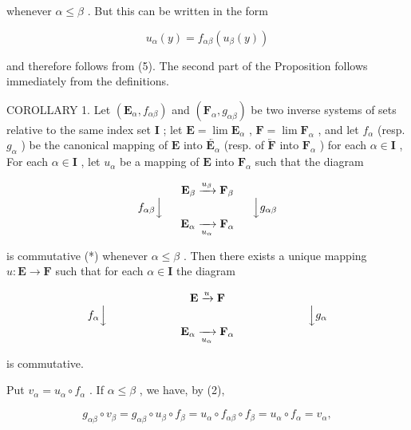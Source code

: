 whenever \(\alpha \leqslant \beta\) . But this can be written in the form

\[
u _ {\alpha} (y) = f _ {\alpha \beta} (u _ {\beta} (y))
\]

and therefore follows from (5). The second part of the Proposition follows immediately from the definitions.

COROLLARY 1. Let \((\mathbf{E}_{\alpha}, f_{\alpha \beta})\) and \((\mathbf{F}_{\alpha}, g_{\alpha \beta})\) be two inverse systems of sets relative to the same index set \(\mathbf{I}\) ; let \(\mathbf{E} = \lim \mathbf{E}_{\alpha}\) , \(\mathbf{F} = \lim \mathbf{F}_{\alpha}\) , and let \(f_{\alpha}\) (resp. \(g_{\alpha}\) ) be the canonical mapping of \(\mathbf{E}\) into \(\overleftarrow{\mathbf{E}_{\alpha}}\) (resp. of \(\overleftarrow{\mathbf{F}}\) into \(\mathbf{F}_{\alpha}\) ) for each \(\alpha \in \mathbf{I}\) , For each \(\alpha \in \mathbf{I}\) , let \(u_{\alpha}\) be a mapping of \(\mathbf{E}\) into \(\mathbf{F}_{\alpha}\) such that the diagram

\[
\begin{array}{c} \mathbf {E} _ {\beta} \xrightarrow {u _ {\beta}} \mathbf {F} _ {\beta} \\ f _ {\alpha \beta} \Big \downarrow \qquad \qquad \qquad \qquad \Big \downarrow g _ {\alpha \beta} \\ \mathbf {E} _ {\alpha} \xrightarrow [ u _ {\alpha} ]{} \mathbf {F} _ {\alpha} \end{array}
\]

is commutative (*) whenever \(\alpha \leqslant \beta\) . Then there exists a unique mapping \(u: \mathbf{E} \to \mathbf{F}\) such that for each \(\alpha \in \mathbf{I}\) the diagram

\[
\begin{array}{c} \mathbf {E} \xrightarrow {u} \mathbf {F} \\ f _ {\alpha} \Big \downarrow \qquad \qquad \qquad \qquad \qquad \qquad \qquad \qquad \qquad \Big \downarrow g _ {\alpha} \\ \mathbf {E} _ {\alpha} \xrightarrow [ u _ {\alpha} ]{} \mathbf {F} _ {\alpha} \end{array}
\]

is commutative.

Put \(v_{\alpha} = u_{\alpha} \circ f_{\alpha}\) . If \(\alpha \leqslant \beta\) , we have, by (2),

\[
g _ {\alpha \beta} \circ v _ {\beta} = g _ {\alpha \beta} \circ u _ {\beta} \circ f _ {\beta} = u _ {\alpha} \circ f _ {\alpha \beta} \circ f _ {\beta} = u _ {\alpha} \circ f _ {\alpha} = v _ {\alpha},
\]

